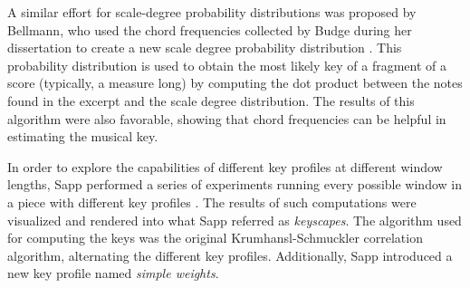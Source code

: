 A similar effort for scale-degree probability distributions
was proposed by Bellmann, who used the chord frequencies
collected by Budge during her dissertation
\parencite{budge1943study} to create a new scale degree
probability distribution \parencite{bellmann2006about}. This
probability distribution is used to obtain the most likely
key of a fragment of a score (typically, a measure long) by
computing the dot product between the notes found in the
excerpt and the scale degree distribution. The results of
this algorithm were also favorable, showing that chord
frequencies can be helpful in estimating the musical key.






In order to explore the capabilities of different key
profiles at different window lengths, Sapp performed a
series of experiments running every possible window in a
piece with different key profiles
\parencite{sapp2011computational}. The results of such
computations were visualized and rendered into what Sapp
referred as \emph{keyscapes}. The algorithm used for
computing the keys was the original Krumhansl-Schmuckler
correlation algorithm, alternating the different key
profiles. Additionally, Sapp introduced a new key profile
named \emph{simple weights}.

